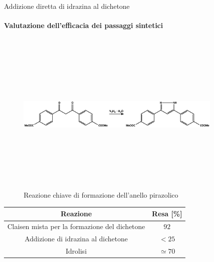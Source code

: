 \documentclass{beamer}
\begin{document}
\begin{frame}{Addizione diretta di idrazina al dichetone}
	\framesubtitle{Valutazione dell'efficacia dei passaggi sintetici}
	\begin{figure}[h]
		\centering
		\includegraphics[width=10cm,height=8cm,keepaspectratio]{../Structures/pyrazole-form.eps}
		\caption{Reazione chiave di formazione dell'anello pirazolico}
	\end{figure}
	\begin{footnotesize}
		\begin{center}
			\begin{tabular}{cc}
				\toprule
				{Reazione}                                    & Resa [\%]     \\
				\midrule
				Claisen mista per la formazione del dichetone & \(92\)        \\
				Addizione di idrazina al dichetone            & \(< 25\)      \\
				Idrolisi                                      & \(\simeq 70\) \\
				\bottomrule
			\end{tabular}
		\end{center}
	\end{footnotesize}
\end{frame}
\end{document}
